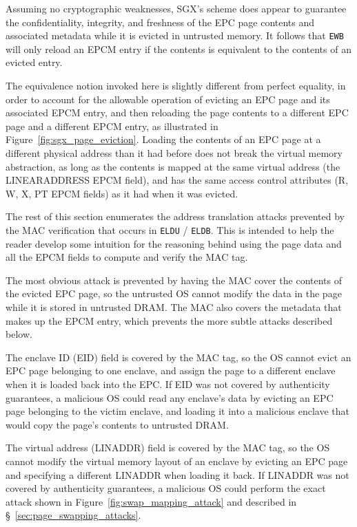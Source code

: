 Assuming no cryptographic weaknesses, SGX's scheme does appear to guarantee the
confidentiality, integrity, and freshness of the EPC page contents and
associated metadata while it is evicted in untrusted memory. It follows that
\texttt{EWB} will only reload an EPCM entry if the contents is equivalent to
the contents of an evicted entry.

The equivalence notion invoked here is slightly different from perfect
equality, in order to account for the allowable operation of evicting an EPC
page and its associated EPCM entry, and then reloading the page contents to a
different EPC page and a different EPCM entry, as illustrated in
Figure~\ref{fig:sgx_page_eviction}. Loading the contents of an EPC page at a
different physical address than it had before does not break the virtual memory
abstraction, as long as the contents is mapped at the same virtual address
(the LINEARADDRESS EPCM field), and has the same access control attributes
(R, W, X, PT EPCM fields) as it had when it was evicted.

The rest of this section enumerates the address translation attacks prevented
by the MAC verification that occurs in \texttt{ELDU} / \texttt{ELDB}. This is
intended to help the reader develop some intuition for the reasoning behind
using the page data and all the EPCM fields to compute and verify the MAC tag.

The most obvious attack is prevented by having the MAC cover the contents of
the evicted EPC page, so the untrusted OS cannot modify the data in the page
while it is stored in untrusted DRAM. The MAC also covers the metadata that
makes up the EPCM entry, which prevents the more subtle attacks described
below.

The enclave ID (EID) field is covered by the MAC tag, so the OS cannot evict an
EPC page belonging to one enclave, and assign the page to a different enclave
when it is loaded back into the EPC. If EID was not covered by authenticity
guarantees, a malicious OS could read any enclave's data by evicting an EPC
page belonging to the victim enclave, and loading it into a malicious enclave
that would copy the page's contents to untrusted DRAM.

The virtual address (LINADDR) field is covered by the MAC tag, so the OS cannot
modify the virtual memory layout of an enclave by evicting an EPC page and
specifying a different LINADDR when loading it back. If LINADDR was not covered
by authenticity guarantees, a malicious OS could perform the exact attack shown
in Figure~\ref{fig:swap_mapping_attack} and described in
\S~\ref{sec:page_swapping_attacks}.

